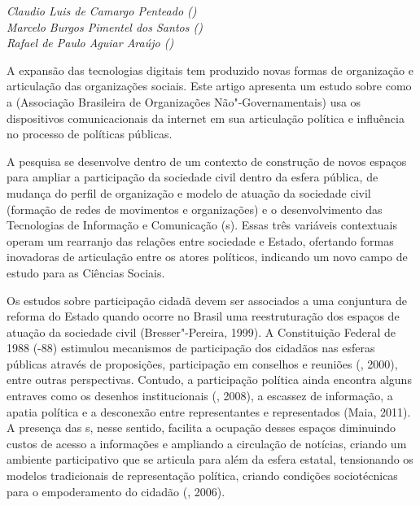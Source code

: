 \begin{flushright}
\emph{Claudio Luis de Camargo Penteado ()\\Marcelo Burgos Pimentel
dos Santos ()\\Rafael de Paulo Aguiar Araújo ()}
\end{flushright}


A expansão das tecnologias digitais tem produzido novas formas de
organização e articulação das organizações sociais. Este artigo
apresenta um estudo sobre como a  (Associação Brasileira de
Organizações Não"-Governamentais) usa os dispositivos comunicacionais da
internet em sua articulação política e influência no processo de
políticas públicas.

A pesquisa se desenvolve dentro de um contexto de construção de novos
espaços para ampliar a participação da sociedade civil dentro da esfera
pública, de mudança do perfil de organização e modelo de atuação da
sociedade civil (formação de redes de movimentos e organizações) e o
desenvolvimento das Tecnologias de Informação e Comunicação (s).
Essas três variáveis contextuais operam um rearranjo das relações entre
sociedade e Estado, ofertando formas inovadoras de articulação entre os
atores políticos, indicando um novo campo de estudo para as Ciências
Sociais.

Os estudos sobre participação cidadã devem ser associados a uma
conjuntura de reforma do Estado quando ocorre no Brasil uma
reestruturação dos espaços de atuação da sociedade civil
(Bresser"-Pereira, 1999). A Constituição Federal de 1988 (-88)
estimulou mecanismos de participação dos cidadãos nas esferas públicas
através de proposições, participação em conselhos e reuniões (,
2000), entre outras perspectivas. Contudo, a participação política ainda
encontra alguns entraves como os desenhos institucionais (,
2008), a escassez de informação, a apatia política e a desconexão entre
representantes e representados (Maia, 2011). A presença das s, nesse
sentido, facilita a ocupação desses espaços diminuindo custos de acesso
a informações e ampliando a circulação de notícias, criando um ambiente
participativo que se articula para além da esfera estatal, tensionando
os modelos tradicionais de representação política, criando condições
sociotécnicas para o empoderamento do cidadão (, 2006).

